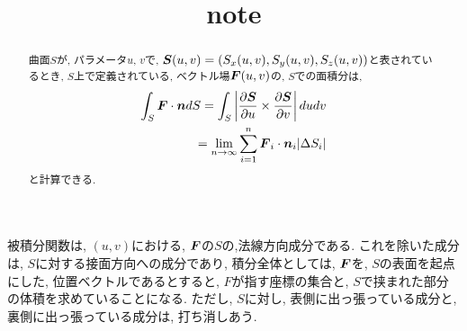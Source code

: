 \documentclass{jsarticle} \usepackage[dvipdfmx]{graphicx} \usepackage[dvipdfmx]{hyperref}
\title{note}
\newcommand*{\mbold}[1]{\mbox{\boldmath $#1$}}
\begin{document}
\maketitle

\begin{abstract}
  曲面$S$が, パラメータ$u$, $v$で, $\mbold{S}(u, v) = (S_x(u, v), S_y(u, v), S_z(u, v))$と表されているとき, 
  $S$上で定義されている, ベクトル場$\mbold{F}(u, v)$の, $S$での面積分は, 
  \begin{eqnarray}
    \int_S \mbold{F} \cdot \mbold{n}dS 
    = \int_S \left| \frac{\partial \mbold{S}}{\partial u} \times \frac{\partial \mbold{S}}{\partial v} \right| du dv \nonumber \\
    = \lim_{n \to \infty} \sum_{i = 1}^n \mbold{F}_i \cdot \mbold{n}_i |\Delta S_i|
  \end{eqnarray}
  と計算できる. 
\end{abstract}

被積分関数は, $(u, v)$における, $\mbold{F}$の$S$の,法線方向成分である. これを除いた成分は, $S$に対する接面方向への成分であり, 積分全体としては, $\mbold{F}$を, $S$の表面を起点にした, 位置ベクトルであるとすると, $F$が指す座標の集合と, $S$で挟まれた部分の体積を求めていることになる. ただし, $S$に対し, 表側に出っ張っている成分と, 裏側に出っ張っている成分は, 打ち消しあう. 
\end{document}
